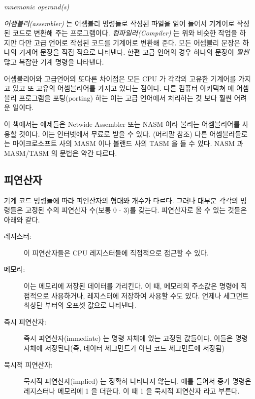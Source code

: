 \begin{CodeQuote}
  {\em mnemonic operand(s)}
\end{CodeQuote}

\emph{어셈블러(assembler)}  는 어셈블리 명령들로 작성된 파일을 읽어 들어서 기계어로 작성된 코드로 변환해 주는 프로그램이다. 
\emph{컴파일러(Compiler)}  는 위와 비슷한 작업을 하지만 다만 고급 언어로 작성된 코드를 기계어로 변환해 준다.
 모든 어셈블리 문장은 하나의 기계어 문장을 직접
적으로 나타낸다. 한편 고급 언어의 경우 하나의 문장이 \emph{훨씬} 많고 복잡한 기계 명령을 나타낸다. 

어셈블리어와 고급언어의 또다른 차이점은 모든 CPU 가 각각의 고유한 기계어를 가지고 있고 또 고유의 어셈블리어를 가지고 있다는 점이다. 다른 컴퓨터 아키텍쳐
에 어셈블리 프로그램을 포팅(porting) 하는 이는 고급 언어에서 처리하는 것 보다 훨씬 어려운 일이다. 

이 책에서는 예제들은 Netwide Assembler 또는 NASM  이라 불리는 어셈블리어를 사용할 것이다. 이는 인터넷에서 무료로 받을 수 있다. 
(머리말 참조)
다른 어셈블러들로는 마이크로소프트 사의 MASM  이나 볼랜드 사의 TASM  을 들 수 있다. NASM 과 MASM/TASM 의 
문법은 약간 다르다. 

\subsection{피연산자}

기계 코드 명령들에 따라 피연산자의 형태와 개수가 다르다. 그러나 대부분 각각의 명령들은 고정된 수의 피연산자 수(보통 0 - 3)를 갖는다. 
피연산자로 올 수 있는 것들은 아래와 같다.

\begin{description}
\item[레지스터:]
이 피연산자들은 CPU 레지스터들에 직접적으로 접근할 수 있다. 

\item[메모리:]
이는 메모리에 저장된 데이터를 가리킨다. 이 때, 메모리의 주소값은 명령에 직접적으로 사용하거나, 레지스터에 저장하여 사용할 수도 있다.
언제나 세그먼트 최상단 부터의 오프셋 값으로 나타낸다. 

\item[즉시 피연산자:]
즉시 피연산자(immediate) 는 명령 자체에 있는 고정된 값들이다. 이들은 명령 자체에 저장된다(즉, 데이터 세그먼트가 아닌 코드 세그먼트에 저장됨)

\item[묵시적 피연산자:]
묵시적 피연산자(implied) 는 정확히 나타나지 않는다. 예를 들어서 증가 명령은 레지스터나 메모리에 1 을 더한다. 이 때 1 을 묵시적 피연산자 라고 부른다. 
\end{description}

